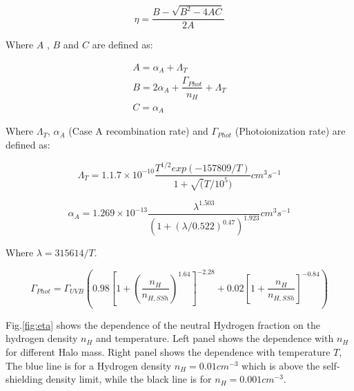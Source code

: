 \documentclass[12pt]{article}
\begin{document}
\begin{equation}\label{eq:eta}
\eta = \dfrac{B - \sqrt{B^2 - 4AC}}{2A}
\end{equation}

Where $A$ , $B$ and $C$ are defined as:

\begin{equation}
\begin{split}
A = \alpha_A + \Lambda_T \\
B = 2\alpha_A + \dfrac{\Gamma_{Phot}}{n_H} + \Lambda_T \\
C = \alpha_A
\end{split}
\end{equation}

Where $\Lambda_T$, $\alpha_A$ (Case A recombination rate) and
$\Gamma_{Phot}$ (Photoionization rate) are defined as:

\begin{equation}
\Lambda_T = 1.1.7 \times 10 ^{-10} \dfrac{T^{1/2} exp(-157809/T)}{1 + \sqrt(T/10^5)} cm^3 s^{-1}
\end{equation}


\begin{equation}
\alpha_A = 1.269 \times 10 ^{-13} \dfrac{\lambda^{1.503}}{(1 + (\lambda / 0.522)^{0.47} )^{1.923}} cm^{3} s^{-1}
\end{equation}

Where $\lambda = 315614 / T$.

\begin{equation}
\Gamma_{Phot} = \Gamma_{UVB} \left(  0.98\left[ 1 + \left( \dfrac{n_H}{n_{H, SSh}} \right)^{1.64}  \right]^{-2.28} + 0.02 \left[ 1 + \dfrac{n_H}{n_{H,SSh}} \right]^{-0.84}   \right)
\end{equation}

Fig.\ref{fig:eta} shows the dependence of the neutral Hydrogen
fraction on the hydrogen density $n_H$ and temperature. Left panel
shows the dependence with $n_H$ for different Halo mass. Right panel
shows the dependence with temperature $T$, The blue
line is for a Hydrogen density $n_H = 0.01 cm^{-3}$
which is above the self-shielding density limit, while the black line is for $n_H  = 0.001 cm^{-3}$.
\end{document}
